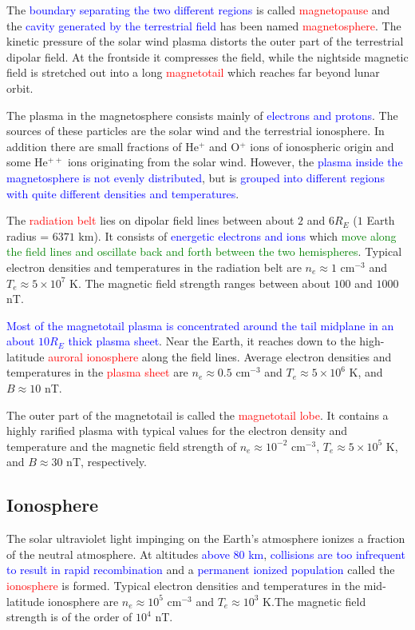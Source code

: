 \documentclass[12pt,a4paper]{article}
\begin{document}
The \textcolor{blue}{boundary separating the two different regions} is called \textcolor{red}{magnetopause} and the \textcolor{blue}{cavity generated by the terrestrial field} has been named \textcolor{red}{magnetosphere}. The kinetic pressure of the solar wind plasma distorts the outer part of the terrestrial dipolar field. At the frontside it compresses the field, while the nightside magnetic field is stretched out into a long \textcolor{red}{magnetotail} which reaches far beyond lunar orbit.

The plasma in the magnetosphere consists mainly of \textcolor{blue}{electrons and protons}. The sources of these particles are the solar wind and the terrestrial ionosphere. In addition there are small fractions of He$^+$ and O$^+$ ions of ionospheric origin and some He$^{++}$ ions originating from the solar wind. However, the \textcolor{blue}{plasma inside the magnetosphere is not evenly distributed}, but is \textcolor{blue}{grouped into different regions with quite different densities and temperatures}. 

The \textcolor{red}{radiation belt} lies on dipolar field lines between about $2$ and $6  R_E$ ($1$ Earth radius = $6371$ km). It consists of \textcolor{blue}{energetic electrons and ions} which \textcolor{green}{move along the field lines and oscillate back and forth between the two hemispheres}. Typical electron densities and temperatures in the radiation belt are $n_e \approx 1$ cm$^{-3}$ and $T_e \approx 5\times 10^7$ K. The magnetic field strength ranges between about $100$ and $1000$ nT.

\textcolor{blue}{Most of the magnetotail plasma is concentrated around the tail midplane in an about $10 R_E$ thick plasma sheet}. Near the Earth, it reaches down to the high-latitude \textcolor{red}{auroral ionosphere} along the field lines. Average electron densities and temperatures in the \textcolor{red}{plasma sheet} are $n_e \approx 0.5$ cm$^{-3}$ and $T_e \approx 5\times 10^6$ K, and $B \approx 10$ nT.

The outer part of the magnetotail is called the \textcolor{red}{magnetotail lobe}. It contains a highly rarified plasma with typical values for the electron density and temperature and the magnetic field strength of $n_e \approx 10^{-2}$ cm$^{-3}$, $T_e \approx 5 \times 10^5$ K, and $B \approx 30$ nT, respectively.


\subsection{Ionosphere}
\cite{1996bspp.book.....B} The solar ultraviolet light impinging on the Earth's atmosphere ionizes a fraction of the neutral atmosphere. At altitudes \textcolor{blue}{above $80$ km}, \textcolor{blue}{collisions are too infrequent to result in rapid recombination} and a \textcolor{blue}{permanent ionized population} called the  \textcolor{red}{ionosphere} is formed. Typical electron densities and temperatures in the mid-latitude ionosphere are $n_e \approx 10^5$ cm$^{-3}$ and $T_e \approx 10^3$ K.The magnetic field strength is of the order of $10^4$ nT.
\end{document}
